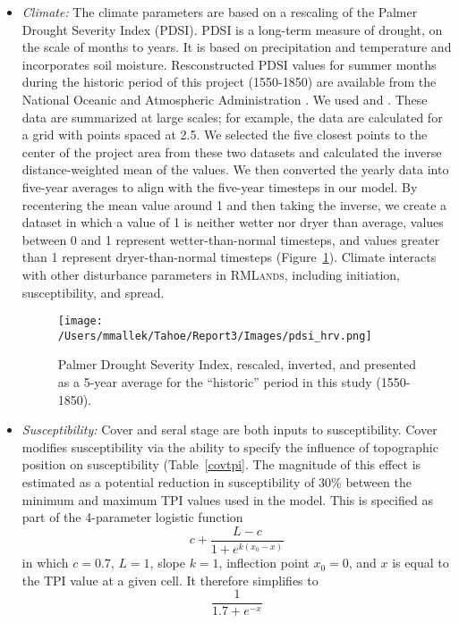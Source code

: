 \begin{itemize}
\item \emph{Climate:} The climate parameters are based on a rescaling of the Palmer Drought Severity Index (PDSI). PDSI is a long-term measure of drought, on the scale of months to years. It is based on precipitation and temperature and incorporates soil moisture. Resconstructed PDSI values for summer months during the historic period of this project (1550-1850) are available from the National Oceanic and Atmospheric Administration . We used \citet{Zhangetal.2004} and \citet{Cook2004}. These data are summarized at large scales; for example, the \citet{Cook2004} data are calculated for a grid with points spaced at 2.5\textdegree. We selected the five closest points to the center of the project area from these two datasets and calculated the inverse distance-weighted mean of the values. We then converted the yearly data into five-year averages to align with the five-year timesteps in our model. By recentering the mean value around 1 and then taking the inverse, we create a dataset in which a value of 1 is neither wetter nor dryer than average, values between 0 and 1 represent wetter-than-normal timesteps, and values greater than 1 represent dryer-than-normal timesteps (Figure~\ref{pdsi}). Climate interacts with other disturbance parameters in \textsc{RMLands}, including initiation, susceptibility, and spread.

\begin{figure}[htbp]
\centering
\texttt{[image: /Users/mmallek/Tahoe/Report3/Images/pdsi\_hrv.png]}
\caption{Palmer Drought Severity Index, rescaled, inverted, and presented as a 5-year average for the ``historic'' period in this study (1550-1850).} 
\label{pdsi}
\end{figure}


\item \emph{Susceptibility:} Cover and seral stage are both inputs to susceptibility. Cover modifies susceptibility via the ability to specify the influence of topographic position on susceptibility (Table~\ref{covtpi}. The magnitude of this effect is estimated as a potential reduction in susceptibility of 30\% between the minimum and maximum TPI values used in the model. This is specified as part of the 4-parameter logistic function 
$$c + \frac{L-c}{1+e^{k(x_0-x)}}$$
in which $c= 0.7$, $L=1$, slope $k=1$, inflection point $x_0=0$, and $x$ is equal to the TPI value at a given cell. It therefore simplifies to 
$$\frac{1}{1.7+e^{-x}}$$


\end{itemize}
